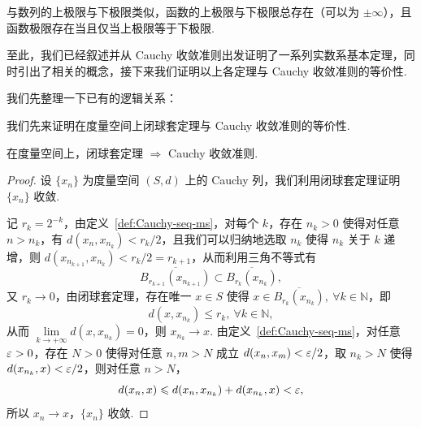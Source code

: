 \documentclass[../main.tex]{subfiles}
\begin{document}
与数列的上极限与下极限类似，函数的上极限与下极限总存在（可以为 $\pm\infty$），且函数极限存在当且仅当上极限等于下极限. 

至此，我们已经叙述并从 Cauchy 收敛准则出发证明了一系列实数系基本定理，同时引出了相关的概念，接下来我们证明以上各定理与 Cauchy 收敛准则的等价性. 

我们先整理一下已有的逻辑关系：

\begin{center}
\end{center}

我们先来证明在度量空间上闭球套定理与 Cauchy 收敛准则的等价性. 

\begin{proposition}
    在度量空间上，闭球套定理 $\Longrightarrow$ Cauchy 收敛准则. 
\end{proposition}

\begin{proof}
    设 $\{x_n\}$ 为度量空间 $(S, d)$ 上的 Cauchy 列，我们利用闭球套定理证明 $\{x_n\}$ 收敛. 
    
    记 $r_k = 2^{-k}$，由定义~\ref{def:Cauchy-seq-ms}，对每个 $k$，存在 $n_k > 0$ 使得对任意 $n > n_k$，有 $d(x_n, x_{n_k}) < r_k / 2$，且我们可以归纳地选取 $n_k$ 使得 $n_k$ 关于 $k$ 递增，则 $d(x_{n_{k + 1}}, x_{n_k}) < r_k / 2 = r_{k + 1}$，从而利用三角不等式有 
    $$
    \overline{B_{r_{k + 1}}(x_{n_{k + 1}})} \subset \overline{B_{r_k}(x_{n_k})}, 
    $$
    又 $r_k \to 0$，由闭球套定理，存在唯一 $x \in S$ 使得 $x \in \overline{B_{r_k}(x_{n_k})},\ \forall k \in \mathbb N$，即 
    $$
    d(x, x_{n_k}) \leqslant r_k,\ \forall k \in \mathbb N, 
    $$
    从而 $\lim\limits_{k \to +\infty} d(x, x_{n_k}) = 0$，则 $x_{n_k} \to x$. 由定义~\ref{def:Cauchy-seq-ms}，对任意 $\varepsilon > 0$，存在 $N > 0$ 使得对任意 $n, m > N$ 成立 $d(x_n, x_m) < \varepsilon / 2$，取 $n_k > N$ 使得 $d(x_{n_k}, x) < \varepsilon / 2$，则对任意 $n > N$，
    $$
    d(x_n, x) \leqslant d(x_n, x_{n_k}) + d(x_{n_k}, x) < \varepsilon, 
    $$
    所以 $x_n \to x$，$\{x_n\}$ 收敛. 
\end{proof}
\end{document}
